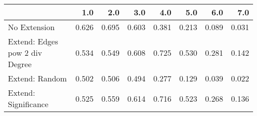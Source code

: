 \begin{tabular}{lrrrrrrr}
\toprule
{} &   1.0 &   2.0 &   3.0 &   4.0 &   5.0 &   6.0 &   7.0 \\
\midrule
No Extension                   & 0.626 & 0.695 & 0.603 & 0.381 & 0.213 & 0.089 & 0.031 \\
Extend: Edges pow 2 div Degree & 0.534 & 0.549 & 0.608 & 0.725 & 0.530 & 0.281 & 0.142 \\
Extend: Random                 & 0.502 & 0.506 & 0.494 & 0.277 & 0.129 & 0.039 & 0.022 \\
Extend: Significance           & 0.525 & 0.559 & 0.614 & 0.716 & 0.523 & 0.268 & 0.136 \\
\bottomrule
\end{tabular}
